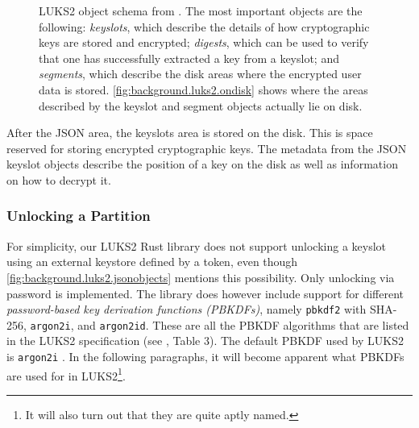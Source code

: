\begin{figure}[htb!]
	\center
	\caption[
		LUKS2 object schema
	]{
		LUKS2 object schema from \cite{Broz2018}. The most important objects are the following: \emph{keyslots}, which describe the details of how cryptographic keys are stored and encrypted; \emph{digests}, which can be used to verify that one has successfully extracted a key from a keyslot; and \emph{segments}, which describe the disk areas where the encrypted user data is stored. \autoref{fig:background.luks2.ondisk} shows where the areas described by the keyslot and segment objects actually lie on disk.
	}
	\label{fig:background.luks2.jsonobjects}
\end{figure}

After the JSON area, the keyslots area is stored on the disk. This is space reserved for storing encrypted cryptographic keys. The metadata from the JSON keyslot objects describe the position of a key on the disk as well as information on how to decrypt it. 

\subsubsection{Unlocking a Partition}
\label{chap:background.luks2.unlocking}
For simplicity, our LUKS2 Rust library does not support unlocking a keyslot using an external keystore defined by a token, even though \autoref{fig:background.luks2.jsonobjects} mentions this possibility. Only unlocking via password is implemented. The library does however include support for different \emph{password-based key derivation functions (PBKDFs)}, namely \texttt{pbkdf2} with SHA-256, \texttt{argon2i}, and \texttt{argon2id}. These are all the PBKDF algorithms that are listed in the LUKS2 specification (see \cite{Broz2018}, Table 3). The default PBKDF used by LUKS2 is \texttt{argon2i} \cite{Cryptsetup2020}. In the following paragraphs, it will become apparent what PBKDFs are used for in LUKS2\footnote{\label{fn:background.luks2.pbkdfs} It will also turn out that they are quite aptly named.}.

